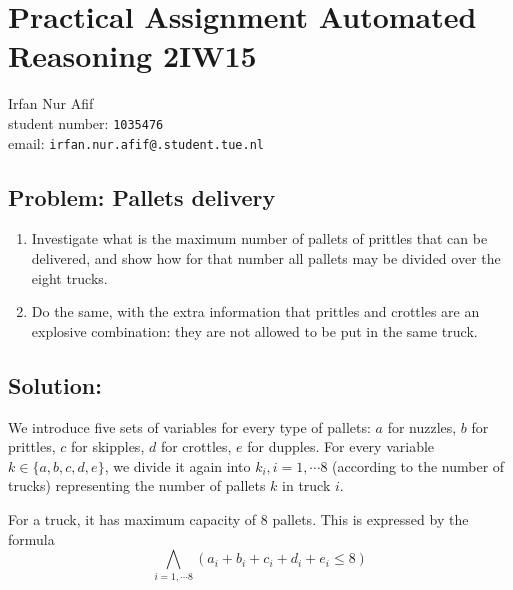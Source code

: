 \documentclass[12pt]{article}
\begin{document}
\section*{Practical
Assignment Automated Reasoning 2IW15 }

\begin{center}
Irfan Nur Afif \\
student number: {\tt 1035476}\\
email: {\tt irfan.nur.afif@.student.tue.nl}
\end{center}

\vspace{8mm}

\subsection*{Problem: Pallets delivery}

\begin{enumerate}
	\item Investigate what is the maximum number of pallets of prittles that can be delivered,
	and show how for that number all pallets may be divided over the eight trucks.
	\item Do the same, with the extra information that prittles and crottles are an explosive combination: they are not allowed to be put in the same truck.
\end{enumerate}
 

\vspace{8mm}

\subsection*{Solution:}

We introduce five sets of variables for every type of pallets: $a$ for nuzzles, $b$ for prittles,  $c$ for skipples, $d$ for crottles, $e$ for dupples. For every variable $k \in\{a,b,c,d,e\}$, we divide it again into $k_i, i=1, \cdots 8$ (according to the number of trucks) representing the number of pallets $k$ in truck $i$.

For a truck, it has maximum capacity of 8 pallets. This is expressed by the formula
\[\bigwedge_{i=1,\cdots 8}{(a_i + b_i + c_i + d_i + e_i \leq 8  )}\]
\end{document}
